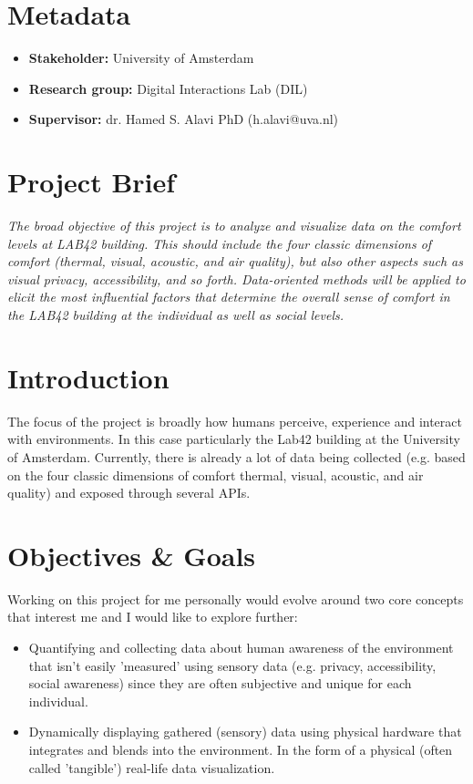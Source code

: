 \section{Metadata}

\begin{itemize}
  \item \textbf{Stakeholder:} University of Amsterdam
  \item \textbf{Research group:} Digital Interactions Lab (DIL)
  \item \textbf{Supervisor:} dr. Hamed S. Alavi PhD (h.alavi@uva.nl)

\end{itemize}

\section{Project Brief}

\textit{The broad objective of this project is to analyze and visualize data on the comfort levels at LAB42 building. This should include the four classic dimensions of comfort (thermal, visual, acoustic, and air quality), but also other aspects such as visual privacy, accessibility, and so forth. Data-oriented methods will be applied to elicit the most influential factors that determine the overall sense of comfort in the LAB42 building at the individual as well as social levels.}

\section{Introduction}

The focus of the project is broadly how humans perceive, experience and interact with environments. In this case particularly the Lab42 building at the University of Amsterdam. Currently, there is already a lot of data being collected (e.g. based on the four classic dimensions of comfort thermal, visual, acoustic, and air quality) and exposed through several APIs.

\section{Objectives \& Goals}

Working on this project for me personally would evolve around two core concepts that interest me and I would like to explore further:

\begin{itemize}
  \item Quantifying and collecting data about human awareness of the environment that isn't easily 'measured' using sensory data (e.g. privacy, accessibility, social awareness) since they are often subjective and unique for each individual.
  \item Dynamically displaying gathered (sensory) data using physical hardware that integrates and blends into the environment. In the form of a physical (often called 'tangible') real-life data visualization.
\end{itemize}

